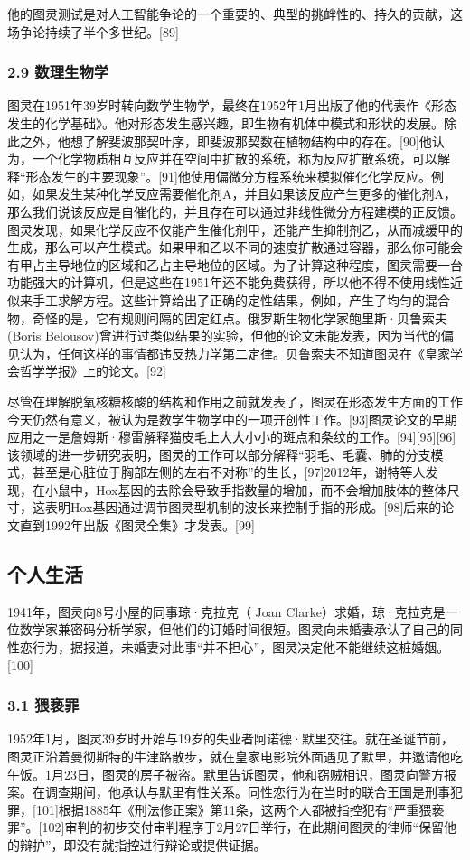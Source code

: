 他的图灵测试是对人工智能争论的一个重要的、典型的挑衅性的、持久的贡献，这场争论持续了半个多世纪。[89]
\subsubsection{2.9 数理生物学}
图灵在1951年39岁时转向数学生物学，最终在1952年1月出版了他的代表作《形态发生的化学基础》。他对形态发生感兴趣，即生物有机体中模式和形状的发展。除此之外，他想了解斐波那契叶序，即斐波那契数在植物结构中的存在。[90]他认为，一个化学物质相互反应并在空间中扩散的系统，称为反应扩散系统，可以解释“形态发生的主要现象”。[91]他使用偏微分方程系统来模拟催化化学反应。例如，如果发生某种化学反应需要催化剂A，并且如果该反应产生更多的催化剂A，那么我们说该反应是自催化的，并且存在可以通过非线性微分方程建模的正反馈。图灵发现，如果化学反应不仅能产生催化剂甲，还能产生抑制剂乙，从而减缓甲的生成，那么可以产生模式。如果甲和乙以不同的速度扩散通过容器，那么你可能会有甲占主导地位的区域和乙占主导地位的区域。为了计算这种程度，图灵需要一台功能强大的计算机，但是这些在1951年还不能免费获得，所以他不得不使用线性近似来手工求解方程。这些计算给出了正确的定性结果，例如，产生了均匀的混合物，奇怪的是，它有规则间隔的固定红点。俄罗斯生物化学家鲍里斯·贝鲁索夫(Boris Belousov)曾进行过类似结果的实验，但他的论文未能发表，因为当代的偏见认为，任何这样的事情都违反热力学第二定律。贝鲁索夫不知道图灵在《皇家学会哲学学报》上的论文。[92]

尽管在理解脱氧核糖核酸的结构和作用之前就发表了，图灵在形态发生方面的工作今天仍然有意义，被认为是数学生物学中的一项开创性工作。[93]图灵论文的早期应用之一是詹姆斯·穆雷解释猫皮毛上大大小小的斑点和条纹的工作。[94][95][96]该领域的进一步研究表明，图灵的工作可以部分解释“羽毛、毛囊、肺的分支模式，甚至是心脏位于胸部左侧的左右不对称”的生长，[97]2012年，谢特等人发现，在小鼠中，Hox基因的去除会导致手指数量的增加，而不会增加肢体的整体尺寸，这表明Hox基因通过调节图灵型机制的波长来控制手指的形成。[98]后来的论文直到1992年出版《图灵全集》才发表。[99]

\subsection{个人生活}
1941年，图灵向8号小屋的同事琼·克拉克（ Joan Clarke）求婚，琼·克拉克是一位数学家兼密码分析学家，但他们的订婚时间很短。图灵向未婚妻承认了自己的同性恋行为，据报道，未婚妻对此事“并不担心”，图灵决定他不能继续这桩婚姻。[100]
\subsubsection{3.1 猥亵罪}
1952年1月，图灵39岁时开始与19岁的失业者阿诺德·默里交往。就在圣诞节前，图灵正沿着曼彻斯特的牛津路散步，就在皇家电影院外面遇见了默里，并邀请他吃午饭。1月23日，图灵的房子被盗。默里告诉图灵，他和窃贼相识，图灵向警方报案。在调查期间，他承认与默里有性关系。同性恋行为在当时的联合王国是刑事犯罪，[101]根据1885年《刑法修正案》第11条，这两个人都被指控犯有“严重猥亵罪”。[102]审判的初步交付审判程序于2月27日举行，在此期间图灵的律师“保留他的辩护”，即没有就指控进行辩论或提供证据。

